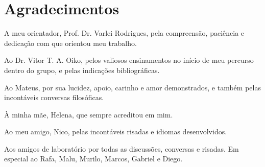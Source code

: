 \newpage

\chapter*{Agradecimentos}

A meu orientador, Prof. Dr. Varlei Rodrigues, pela compreensão, paciência e dedicação com que orientou meu trabalho.

Ao Dr. Vitor T. A. Oiko, pelos valiosos ensinamentos no início de meu percurso dentro do grupo, e pelas indicações bibliográficas.

Ao Mateus, por sua lucidez, apoio, carinho e amor  demonstrados, e também pelas incontáveis conversas filosóficas.

À minha mãe, Helena, que sempre acreditou em mim.

Ao meu amigo, Nico, pelas incontáveis risadas e idiomas desenvolvidos.

Aos amigos de laboratório por todas as discussões, conversas e risadas. Em especial ao Rafa, Malu, Murilo, Marcos, Gabriel e Diego.

\newpage

$ $